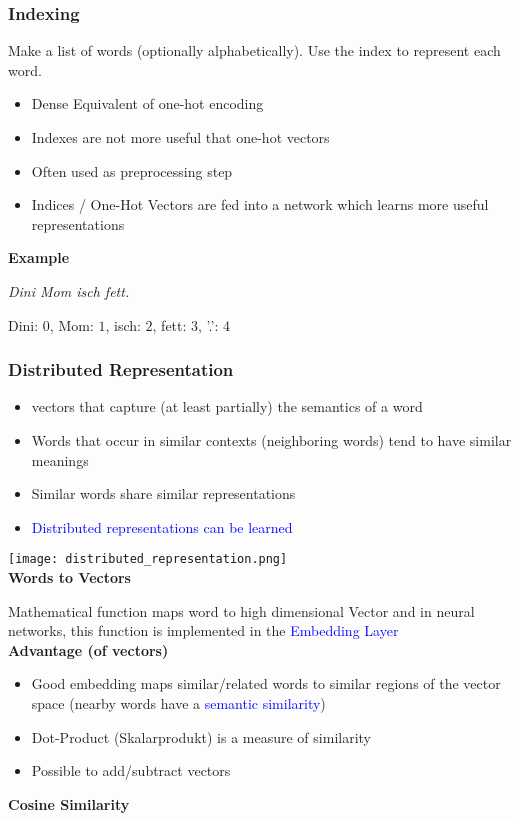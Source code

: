\subsubsection{Indexing}
Make a list of words (optionally alphabetically). Use the index to represent each word.\\

\begin{itemize}
    \item Dense Equivalent of one-hot encoding
    \item Indexes are not more useful that one-hot vectors
    \item Often used as preprocessing step
    \item Indices / One-Hot Vectors are fed into a network which learns more useful representations
\end{itemize}
\vspace{10pt}
\textbf{Example}

\textit{Dini Mom isch fett.}

Dini: $0$, Mom: $1$, isch: $2$, fett: $3$, '.': $4$

\subsubsection{Distributed Representation}
\begin{itemize}
    \item vectors that capture (at least partially) the semantics of a word
    \item Words that occur in similar contexts (neighboring words) tend to have similar meanings
    \item Similar words share similar representations
    \item \textcolor{blue}{Distributed representations can be learned}
\end{itemize}
\texttt{[image: distributed\_representation.png]}\\

\textbf{Words to Vectors}

Mathematical function maps word to high dimensional Vector and in neural networks, this function is implemented in the \textcolor{blue}{Embedding Layer} \\

\textbf{Advantage (of vectors)}
\begin{itemize}
    \item Good embedding maps similar/related words to similar regions of the vector space (nearby words have a \textcolor{blue}{semantic similarity})
    \item Dot-Product (Skalarprodukt) is a measure of similarity
    \item Possible to add/subtract vectors
\end{itemize}
\vspace{10pt}
\textbf{Cosine Similarity}

